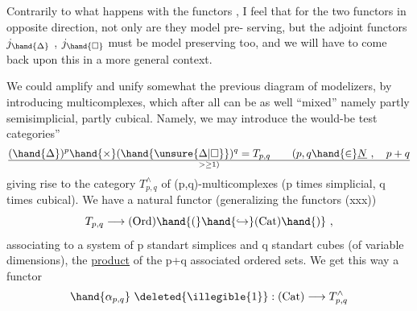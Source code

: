 Contrarily to what happens with the functors \hand{$\alpha$, $\beta$}, \quad I feel that for
the two functors \hand{$\xi,\eta$} in opposite direction, \quad not only are they model pre-%
serving, \quad but the  adjoint functors \quad $j_{\hand{\Delta}}$ , $j_{\hand{\square}}$ must be model preserving too,
and we will have to come back upon this in a more general context.

We could amplify and unify somewhat the previous diagram of modelizers,
by introducing multicomplexes, \quad which after all can be as well ``mixed''
namely partly semisimplicial, \quad partly cubical. \quad Namely, \quad we may introduce
the would-be test categories'' 
\[ (\hand{\Delta})^p \hand{\times} (\hand{\unsure{\Delta|\square}})^q = T_{p,q} \qquad (p,q \hand{\in} \underline{N} \ , \quad p+q \over{>}{\geq} 1) \]
giving rise to the category \quad $T^\wedge_{p,q}$ \hand{\unsure{$\wedge$}} \quad of (p,q)-multicomplexes (p times
simplicial, q times cubical). \quad {} We have a natural functor (generalizing
the functors (xxx))
\[ T_{p,q} \longrightarrow \text{(Ord)} \hand{(} \hand{\hookrightarrow} \text{(Cat)} \hand{)} \ , \]
associating to a system of p standart simplices and q standart cubes
(of variable dimensions), \quad the \uline{product} of the p+q associated ordered sets.
We get this way a functor
\[ \hand{\alpha_{p,q}} \ \deleted{\illegible{1}} : \text{(Cat)} \longrightarrow T^{\wedge}_{p,q} \]

